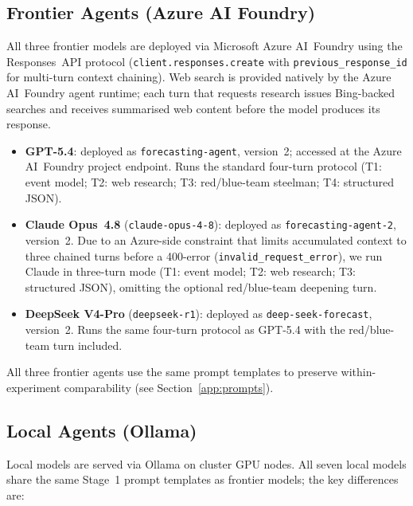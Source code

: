 \documentclass{article} %
\begin{document}
\subsection{Frontier Agents (Azure AI Foundry)}
\label{app:agent-arch-frontier}

All three frontier models are deployed via Microsoft Azure AI~Foundry using the
Responses~API protocol (\texttt{client.responses.create} with
\texttt{previous\_response\_id} for multi-turn context chaining).  Web search is
provided natively by the Azure AI~Foundry agent runtime; each turn that requests
research issues Bing-backed searches and receives summarised web content before the
model produces its response.

\begin{itemize}
  \item \textbf{GPT-5.4}: deployed as \texttt{forecasting-agent}, version~2; accessed at
        the Azure AI~Foundry project endpoint.  Runs the standard four-turn protocol
        (T1: event model; T2: web research; T3: red/blue-team steelman; T4: structured
        JSON).

  \item \textbf{Claude Opus~4.8} (\texttt{claude-opus-4-8}): deployed as
        \texttt{forecasting-agent-2}, version~2.  Due to an Azure-side constraint that
        limits accumulated context to three chained turns before a 400-error
        (\texttt{invalid\_request\_error}), we run Claude in three-turn mode
        (T1: event model; T2: web research; T3: structured JSON), omitting the optional
        red/blue-team deepening turn.

  \item \textbf{DeepSeek V4-Pro} (\texttt{deepseek-r1}): deployed as
        \texttt{deep-seek-forecast}, version~2.  Runs the same four-turn protocol as
        GPT-5.4 with the red/blue-team turn included.
\end{itemize}

All three frontier agents use the same prompt templates to preserve within-experiment
comparability (see Section~\ref{app:prompts}).

\subsection{Local Agents (Ollama)}
\label{app:agent-arch-local}

Local models are served via Ollama on cluster GPU nodes.  All seven local models share
the same Stage~1 prompt templates as frontier models; the key differences are:
\end{document}
